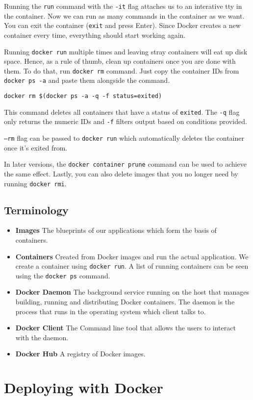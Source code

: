 \documentclass[twoside,twocolumn]{article}
\begin{document}
Running the \texttt{run} command with the \texttt{-it} flag attaches us to an interative tty in the container.
Now we can run as many commands in the container as we want.
You can exit the container (\texttt{exit} and press Enter). Since Docker creates a new container every time, everything should start working again.

Running \texttt{docker run} multiple times and leaving stray containers will eat up disk space.
Hence, as a rule of thumb, clean up containers once you are done with them.
To do that, run \texttt{docker rm} command. Just copy the container IDs from \texttt{docker ps -a} and paste them alongside the command.

\begin{verbatim}
docker rm $(docker ps -a -q -f status=exited)
\end{verbatim}

This command deletes all containers that have a status of \texttt{exited}.
The \texttt{-q} flag only returns the numeric IDs and \texttt{-f} filters output based on conditions provided.

\texttt{--rm} flag can be passed to \texttt{docker run} which automatically deletes the container once it's exited from.

In later versions, the \texttt{docker container prune} command can be used to achieve the same effect.
Lastly, you can also delete images that you no longer need by running \texttt{docker rmi}.

\subsection{Terminology}
\begin{itemize}
    \item \textbf{Images} The blueprints of our applications which form the basis of containers.
    \item \textbf{Containers} Created from Docker images and run the actual application. We create a container using \texttt{docker run}. A list of running containers can be seen using the \texttt{docker ps} command.
    \item \textbf{Docker Daemon} The background service running on the host that manages building, running and distributing Docker containers. The daemon is the process that runs in the operating system which client talks to.
    \item \textbf{Docker Client} The Command line tool that allows the users to interact with the daemon. 
    \item \textbf{Docker Hub} A registry of Docker images. 
\end{itemize}

\section{Deploying with Docker}
\end{document}
